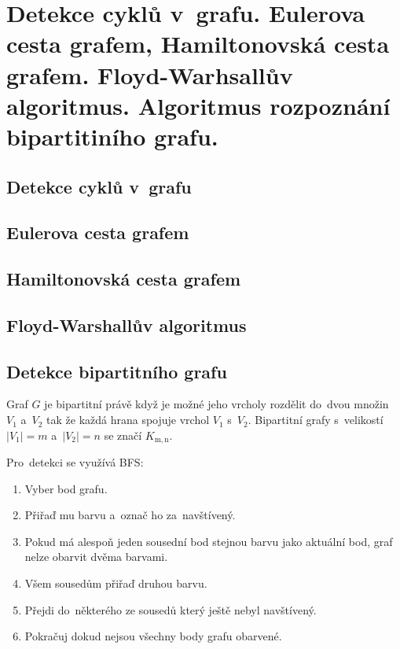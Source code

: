 \clearpage
\section{Detekce cyklů v~grafu. Eulerova cesta grafem, Hamiltonovská cesta grafem. Floyd-Warhsallův algoritmus. Algoritmus rozpoznání bipartitiního grafu.}

\subsection{Detekce cyklů v~grafu}

\subsection{Eulerova cesta grafem}

\subsection{Hamiltonovská cesta grafem}

\subsection{Floyd-Warshallův algoritmus}

\subsection{Detekce bipartitního grafu}

Graf $G$ je bipartitní právě když je možné jeho vrcholy rozdělit do~dvou množin $V_1$ a~$V_2$ tak že každá hrana spojuje vrchol $V_1$ s~$V_2$.
Bipartitní grafy s~velikostí $|V_1|=m$ a~$|V_2|=n$ se značí $K_\mathrm{m,n}$.

Pro~detekci se využívá BFS:

\begin{enumerate}
\item Vyber bod grafu.
\item Přiřaď mu barvu a~označ ho za~navštívený.
\item Pokud má alespoň jeden sousední bod stejnou barvu jako aktuální bod, graf nelze obarvit dvěma barvami.
\item Všem sousedům přiřaď druhou barvu.
\item Přejdi do~některého ze sousedů který ještě nebyl navštívený.
\item Pokračuj dokud nejsou všechny body grafu obarvené.
\end{enumerate}

